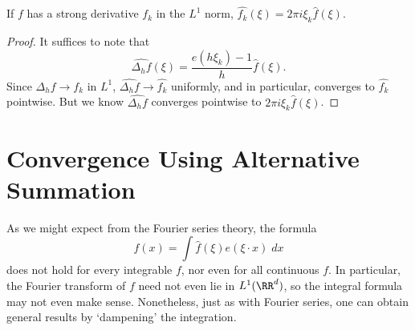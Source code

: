 \begin{theorem}
	If $f$ has a strong derivative $f_k$ in the $L^1$ norm, $\widehat{f_k}(\xi) = 2 \pi i \xi_k \widehat{f}(\xi)$.
\end{theorem}
\begin{proof}
	It suffices to note that
	\[ \widehat{\Delta_h f}(\xi) = \frac{e(h \xi_k) - 1}{h} \widehat{f}(\xi). \]
	Since $\Delta_h f \to f_k$ in $L^1$, $\widehat{\Delta_h f} \to \widehat{f_k}$ uniformly, and in particular, converges to $\widehat{f_k}$ pointwise. But we know $\widehat{\Delta_h f}$ converges pointwise to $2 \pi i \xi_k \widehat{f}(\xi)$.
\end{proof}

%

\section{Convergence Using Alternative Summation}

As we might expect from the Fourier series theory, the formula
%
\[ f(x) = \int \widehat{f}(\xi) e(\xi \cdot x)\; dx \]
%
does not hold for every integrable $f$, nor even for all continuous $f$. In particular, the Fourier transform of $f$ need not even lie in $L^1(\RR^d)$, so the integral formula may not even make sense. Nonetheless, just as with Fourier series, one can obtain general results by `dampening' the integration.


